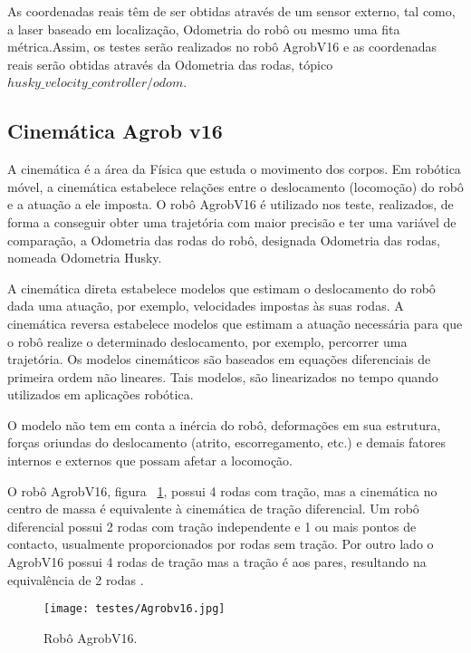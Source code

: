 As coordenadas reais têm de ser obtidas através de um sensor externo, tal como, a laser baseado em localização, Odometria do robô ou mesmo uma fita métrica.Assim, os testes serão realizados no robô AgrobV16 e as coordenadas reais serão obtidas através da Odometria das rodas, tópico \textit{$husky\_velocity\_controller/odom$}.

\subsection{Cinemática Agrob v16}

A cinemática é a área da Física que estuda o movimento dos corpos. Em robótica móvel, a cinemática estabelece relações entre o deslocamento (locomoção) do robô e a atuação a ele imposta. O robô AgrobV16 é utilizado nos teste, realizados, de forma a conseguir obter uma trajetória com maior precisão e ter uma variável de comparação, a Odometria das rodas do robô, designada  Odometria das rodas, nomeada Odometria Husky. 

A cinemática direta estabelece modelos que estimam o deslocamento do robô dada uma atuação, por exemplo, velocidades impostas às suas rodas. A cinemática reversa estabelece modelos que estimam a atuação necessária para que o robô realize o determinado deslocamento, por exemplo, percorrer uma trajetória. Os modelos cinemáticos são baseados em equações diferenciais de primeira ordem não lineares. Tais modelos, são linearizados no tempo quando utilizados em aplicações robótica.


O modelo não tem em conta a inércia do robô, deformações em sua estrutura, forças oriundas do deslocamento (atrito, escorregamento, etc.) e demais fatores internos e externos que possam afetar a locomoção.


O robô AgrobV16, figura ~\ref{fig:agrobv16}, possui 4 rodas com tração, mas a cinemática no centro de massa é equivalente à cinemática de tração diferencial. Um robô diferencial possui 2 rodas com tração independente e 1 ou mais pontos de contacto, usualmente proporcionados por rodas sem tração. Por outro lado o AgrobV16 possui 4 rodas de tração mas a tração é aos pares, resultando na equivalência de 2 rodas .


\begin{figure}[h!] %
	\begin{center}
		\leavevmode		
		\texttt{[image: testes/Agrobv16.jpg]}
		\caption{Robô AgrobV16.}
		\label{fig:agrobv16}
	\end{center}
\end{figure}




